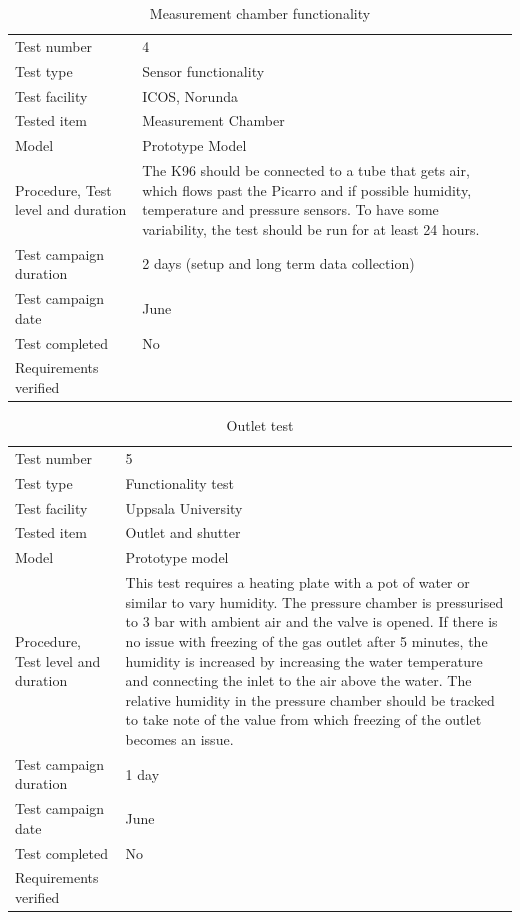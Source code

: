 \begin{table}[H]
\centering
\caption{Measurement chamber functionality}
\label{tab:test4}
\begin{tabular}{L{5cm}L{10cm}}
\toprule
Test number & 4 \\
Test type & Sensor functionality \\
Test facility & ICOS, Norunda \\
Tested item & Measurement Chamber \\
Model & Prototype Model \\
Procedure, Test level and duration & The K96 should be connected to a tube that gets air, which flows past the Picarro and if possible humidity, temperature and pressure sensors. To have some variability, the test should be run for at least 24 hours. \\
Test campaign duration & 2 days (setup and long term data collection) \\
Test campaign date & June \\
Test completed & No \\
Requirements verified & \\
\bottomrule
\end{tabular}
\end{table}

\begin{table}[H]
\centering
\caption{Outlet test}
\label{tab:test5}
\begin{tabular}{L{5cm}L{10cm}}
\toprule
Test number & 5 \\
Test type & Functionality test \\
Test facility & Uppsala University \\
Tested item & Outlet and shutter \\
Model & Prototype model \\
Procedure, Test level and duration & This test requires a heating plate with a pot of water or similar to vary humidity. The pressure chamber is pressurised to 3 bar with ambient air and the valve is opened. If there is no issue with freezing of the gas outlet after 5 minutes, the humidity is increased by increasing the water temperature and connecting the inlet to the air above the water. The relative humidity in the pressure chamber should be tracked to take note of the value from which freezing of the outlet becomes an issue. \\
Test campaign duration & 1 day \\
Test campaign date & June \\
Test completed & No \\
Requirements verified & \\
\bottomrule
\end{tabular}
\end{table}


